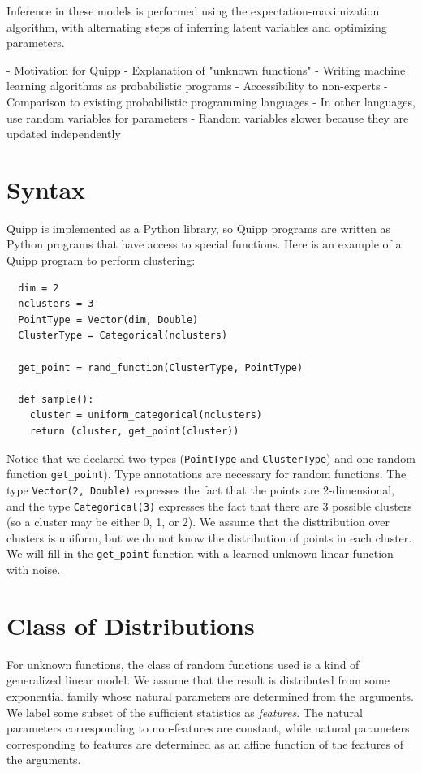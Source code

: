 \documentclass[proceed]{article}
\begin{document}
  Inference in these models is performed using the expectation-maximization
  algorithm, with alternating steps of inferring latent variables and optimizing
  parameters.


  - Motivation for Quipp
    - Explanation of "unknown functions"
    - Writing machine learning algorithms as probabilistic programs
    - Accessibility to non-experts
    - Comparison to existing probabilistic programming languages
      - In other languages, use random variables for parameters
      - Random variables slower because they are updated independently

  \section{Syntax}

  Quipp is implemented as a Python library, so Quipp programs are written as Python programs that have access
  to special functions.  Here is an example of a Quipp program to perform clustering:


  \begin{verbatim}
  dim = 2
  nclusters = 3
  PointType = Vector(dim, Double)
  ClusterType = Categorical(nclusters)

  get_point = rand_function(ClusterType, PointType)

  def sample():
    cluster = uniform_categorical(nclusters)
    return (cluster, get_point(cluster))
  \end{verbatim}

  Notice that we declared two types (\texttt{PointType} and \texttt{ClusterType})
  and one random function \texttt{get\_point}).
  Type annotations are necessary for random functions.  The type
  \texttt{Vector(2, Double)} expresses the fact that the points are 2-dimensional,
  and the type \texttt{Categorical(3)} expresses the fact that there are 3
  possible clusters (so a cluster may be either 0, 1, or 2).  We assume that
  the disttribution over clusters is uniform, but we do not know the distribution
  of points in each cluster.
  We will fill in the
  \texttt{get\_point} function with a learned unknown linear function with noise.

  \section{Class of Distributions}

    For unknown functions, the class of random functions used is a kind
    of generalized linear model.  We assume that the result
    is distributed from some exponential family whose natural
    parameters are determined from the arguments.  We label
    some subset of the sufficient statistics as \emph{features}.  The natural
    parameters corresponding to non-features are constant, while natural
    parameters corresponding to features are determined as an affine
    function of the features of the arguments.
\end{document}
